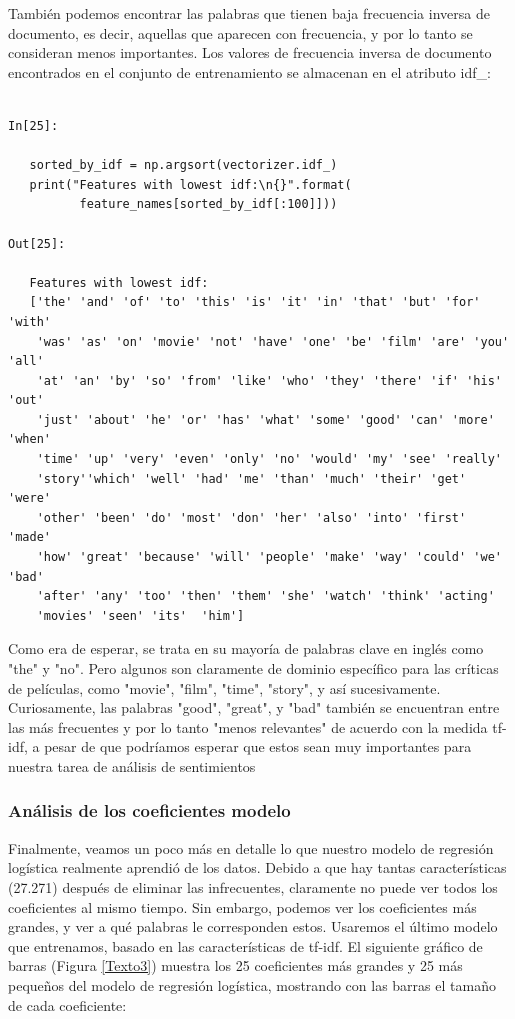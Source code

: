 También podemos encontrar las palabras que tienen baja frecuencia inversa de documento, es decir, 
 aquellas que aparecen con frecuencia, y por lo tanto se consideran menos importantes. Los valores de frecuencia inversa de documento  encontrados en el conjunto de entrenamiento se almacenan en el atributo {\ttfamily idf\_}:


\begin{lstlisting}

In[25]:

   sorted_by_idf = np.argsort(vectorizer.idf_)
   print("Features with lowest idf:\n{}".format(
          feature_names[sorted_by_idf[:100]]))

Out[25]:

   Features with lowest idf:
   ['the' 'and' 'of' 'to' 'this' 'is' 'it' 'in' 'that' 'but' 'for' 'with'
    'was' 'as' 'on' 'movie' 'not' 'have' 'one' 'be' 'film' 'are' 'you' 'all'
    'at' 'an' 'by' 'so' 'from' 'like' 'who' 'they' 'there' 'if' 'his' 'out'
    'just' 'about' 'he' 'or' 'has' 'what' 'some' 'good' 'can' 'more' 'when'
    'time' 'up' 'very' 'even' 'only' 'no' 'would' 'my' 'see' 'really' 
    'story''which' 'well' 'had' 'me' 'than' 'much' 'their' 'get' 'were' 
    'other' 'been' 'do' 'most' 'don' 'her' 'also' 'into' 'first' 'made'
    'how' 'great' 'because' 'will' 'people' 'make' 'way' 'could' 'we' 'bad' 
    'after' 'any' 'too' 'then' 'them' 'she' 'watch' 'think' 'acting' 
    'movies' 'seen' 'its'  'him']

\end{lstlisting}

Como era de esperar, se trata en su mayoría de palabras clave en inglés como
 "{}the"{} y "{}no"{}. Pero algunos son claramente de dominio específico para las críticas de películas, 
 como "{}movie"{}, "{}film"{}, "{}time"{}, "{}story"{}, y así sucesivamente. 
 Curiosamente, las palabras "{}good"{}, "{}great"{}, y "{}bad"{}  también se encuentran entre las más frecuentes y    por lo tanto "{}menos relevantes"{} de acuerdo con la medida   tf-idf,   a pesar de que podríamos   esperar que estos sean muy importantes para nuestra tarea de análisis de sentimientos

\subsubsection{Análisis de los coeficientes modelo}

Finalmente, veamos un poco más en detalle lo que nuestro modelo de regresión logística
 realmente aprendió de los datos. Debido a que hay tantas características (27.271) después 
 de eliminar las infrecuentes,  claramente no puede ver todos los coeficientes al mismo tiempo. 
 Sin embargo, podemos ver  los coeficientes más grandes, y ver a qué palabras le corresponden estos. 
 Usaremos el último modelo que entrenamos, basado en las características de  tf-idf. 
El siguiente gráfico de barras (Figura \ref{Texto3}) muestra los 25 coeficientes más grandes y 25 más pequeños del modelo de regresión logística,  mostrando con las barras  el tamaño de cada coeficiente:


